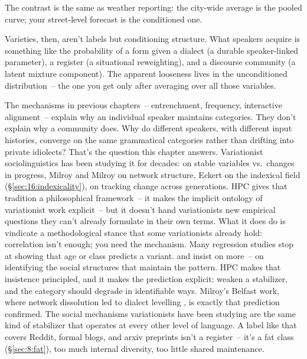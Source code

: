The contrast is the same as weather reporting: the city-wide average is the pooled curve; your street-level forecast is the conditioned one.

Varieties, then, aren't labels but conditioning structure. What speakers acquire is something like the probability of a form given a dialect (a durable speaker-linked parameter), a register (a situational reweighting), and a discourse community (a latent mixture component). The apparent looseness lives in the unconditioned distribution~-- the one you get only after averaging over all those variables.

The mechanisms in previous chapters~-- entrenchment, frequency, interactive alignment~-- explain why an individual speaker maintains categories. They don't explain why a community does. Why do different speakers, with different input histories, converge on the same grammatical categories rather than drifting into private idiolects? That's the question this chapter answers. Variationist sociolinguistics has been studying it for decades: \textcite{labov1972} on stable variables vs.\ changes in progress, Milroy and Milroy on network structure, Eckert on the indexical field (§\ref{sec:16:indexicality}), \textcite{tagliamontedarcy2007} on tracking change across generations. HPC gives that tradition a philosophical framework~-- it makes the implicit ontology of variationist work explicit~-- but it doesn't hand variationists new empirical questions they can't already formulate in their own terms. What it does do is vindicate a methodological stance that some variationists already hold: correlation isn't enough; you need the mechanism. Many regression studies stop at showing that age or class predicts a variant. \textcite{milroy1987} and \textcite{eckert2000} insist on more~-- on identifying the social structures that maintain the pattern. HPC makes that insistence principled, and it makes the prediction explicit: weaken a stabilizer, and the category should degrade in identifiable ways. Milroy's Belfast work, where network dissolution led to dialect levelling \citep{milroy1987}, is exactly that prediction confirmed. The social mechanisms variationists have been studying are the same kind of stabilizer that operates at every other level of language. A label like  that covers Reddit, formal blogs, and arxiv preprints isn't a register~-- it's a fat class (§\ref{sec:8:fat}), too much internal diversity, too little shared maintenance.

